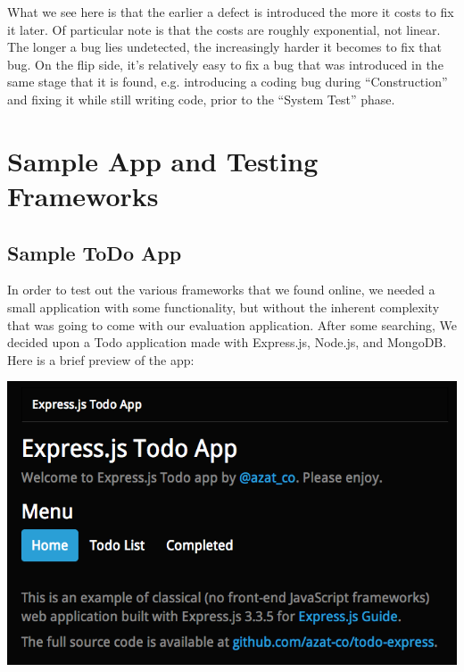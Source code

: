 \documentclass[11pt]{article}
\newenvironment{Figure}
  {\par\medskip\noindent\minipage{\linewidth}}
  {\endminipage\par\medskip}
\begin{document}
What we see here is that the earlier a defect is introduced the more it costs to fix it later. Of particular note is that the costs are roughly exponential, not linear. The longer a bug lies undetected, the increasingly harder it becomes to fix that bug. On the flip side, it's relatively easy to fix a bug that was introduced in the same stage that it is found, e.g. introducing a coding bug during ``Construction'' and fixing it while still writing code, prior to the ``System Test'' phase. 



\section{Sample App and Testing Frameworks}

\subsection{Sample ToDo App}
In order to test out the various frameworks that we found online, we needed a small application with some functionality, but without the inherent complexity that was going to come with our evaluation application. After some searching, We decided upon a Todo application made with Express.js, Node.js, and MongoDB. \cite{ToDoAppHomePage} Here is a brief preview of the app:

\begin{Figure}
  \centering
  \includegraphics[width=0.75\linewidth]{todo_home.png}
\end{Figure}
\end{document}
